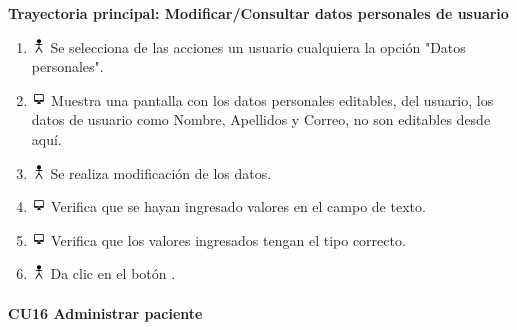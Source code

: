 \textbf{Trayectoria principal: Modificar/Consultar datos personales de usuario}    \begin{enumerate}
\item \includegraphics[height=1em]{pictures/actor.png} Se selecciona de las acciones un usuario cualquiera la opción "Datos personales".
\item \includegraphics[height=1em]{pictures/sistema.png} Muestra una pantalla con los datos personales editables, del usuario, los datos de usuario como Nombre, Apellidos y Correo, no son editables desde aquí.
\item \includegraphics[height=1em]{pictures/actor.png} Se realiza modificación de los datos.
\item \includegraphics[height=1em]{pictures/sistema.png} Verifica que se hayan ingresado valores en el campo de texto.
\item \includegraphics[height=1em]{pictures/sistema.png} Verifica que los valores ingresados tengan el tipo correcto.
\item \includegraphics[height=1em]{pictures/actor.png} Da clic en el botón .
\end{enumerate} \bigskip



\paragraph{CU16 Administrar paciente}

